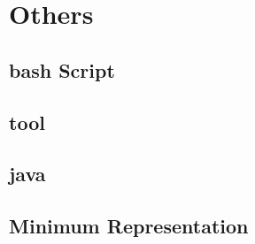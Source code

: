 \documentclass[twocolumn]{article}
\begin{document}
\section{Others}
\subsection{bash Script}

\subsection{tool}

\subsection{java}

\subsection{Minimum Representation}

\end{document}
